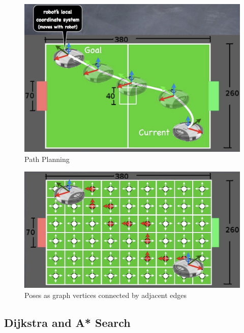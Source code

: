 \begin{figure}[!h]
\centering
\includegraphics[width=0.6\columnwidth]{figures/7_planning4.jpg}
\caption{Path Planning}
\end{figure}

\begin{figure}[!h]
\centering
\includegraphics[width=0.6\columnwidth]{figures/7_planning5.jpg}
\caption{Poses as graph vertices connected by adjacent edges}
\end{figure}


\subsection{Dijkstra and A* Search}

